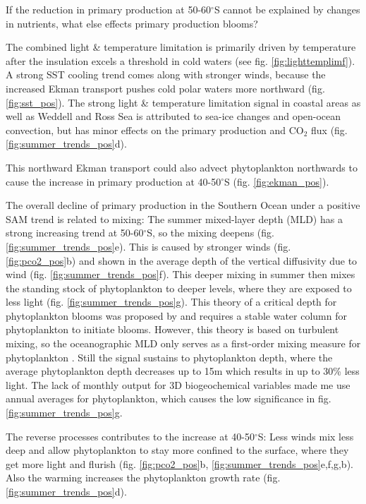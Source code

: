 \documentclass[12pt]{article}
\begin{document}
If the reduction in primary production at 50-60$^\circ$S cannot be explained by changes in nutrients, what else effects primary production blooms?

The combined light \& temperature limitation is primarily driven by temperature after the insulation excels a threshold in cold waters (see fig. \ref{fig:lighttemplimf}). A strong SST cooling trend comes along with stronger winds, because the increased Ekman transport pushes cold polar waters more northward (fig. \ref{fig:sst_pos}). The strong light \& temperature limitation signal in coastal areas as well as Weddell and Ross Sea is attributed to sea-ice changes and open-ocean convection, but has minor effects on the primary production and CO$_2$ flux (fig. \ref{fig:summer_trends_pos}d). 

This northward Ekman transport could also advect phytoplankton northwards to cause the increase in primary production at 40-50$^\circ$S (fig. \ref{fig:ekman_pos}).

The overall decline of primary production in the Southern Ocean under a positive SAM trend is related to mixing:
The summer mixed-layer depth (MLD) has a strong increasing trend at 50-60$^\circ$S, so the mixing deepens (fig. \ref{fig:summer_trends_pos}e). This is caused by stronger winds (fig. \ref{fig:pco2_pos}b) and shown in the average depth of the vertical diffusivity due to wind (fig. \ref{fig:summer_trends_pos}f). This deeper mixing in summer then mixes the standing stock of phytoplankton to deeper levels, where they are exposed to less light (fig. \ref{fig:summer_trends_pos}g). This theory of a critical depth for phytoplankton blooms was proposed by \cite{Sverdrup1953} and requires a stable water column for phytoplankton to initiate blooms. However, this theory is based on turbulent mixing, so the oceanographic MLD only serves as a first-order mixing measure for phytoplankton \citep{Franks2014}. Still the signal sustains to phytoplankton depth, where the average phytoplankton depth decreases up to 15m which results in up to 30\% less light. The lack of monthly output for 3D biogeochemical variables made me use annual averages for phytoplankton, which causes the low significance in fig. \ref{fig:summer_trends_pos}g. 

The reverse processes contributes to the increase at 40-50$^\circ$S: Less winds mix less deep and allow phytoplankton to stay more confined to the surface, where they get more light and flurish (fig. \ref{fig:pco2_pos}b, \ref{fig:summer_trends_pos}e,f,g,b). Also the warming increases the phytoplankton growth rate (fig. \ref{fig:summer_trends_pos}d).
\\
\end{document}
